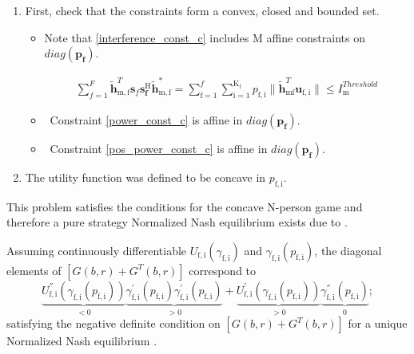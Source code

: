 \documentclass[12pt,a4paper]{report}
\begin{document}
\begin{enumerate}


\item
First, check that the constraints form a convex, closed and bounded set. 

\begin{itemize}

\item
	Note that \eqref{interference_const_c} includes $\text{M}$ affine constraints on $diag(\mathbf{p_{f}})$.

\begin{gather*}
	  \sum^F_{f=1} \mathbf{\tilde{h}}_{\mathrm{m,f}}^T  \mathbf{s}_{f} 						
	\mathbf{s_{f}^{\mathrm{H}}} \mathbf{\tilde{h}_{\mathrm{m,f}}^*} 
	=
	\sum_{\mathrm{f=1}}^{f}	\sum_{\mathrm{i=1}}^{\mathrm{K_f}}
	p_{\mathrm{f,i}}\|\tilde{\mathbf{h}}_{\mathrm{mf}}^T \mathbf{u}_{\mathrm{f,i}}\|
	\leq I^{Threshold}_{\mathrm{m}} 
\end{gather*}

\item \
	Constraint \eqref{power_const_c} is  affine in $diag(\mathbf{p_{f}})$.
	
\item \
	Constraint \eqref{pos_power_const_c} is affine in $diag(\mathbf{p_{f}})$.
\end{itemize}


\item The utility function was defined to be concave in $p_{\mathrm{f,i}}$. 

\end{enumerate}

This problem satisfies the conditions for the concave N-person game and therefore a pure strategy Normalized Nash equilibrium exists due to 
\cite[Thm1]{rosen1964existence}.

Assuming continuously differentiable $U_{\mathrm{f,i}}(\gamma_{\mathrm{f,i}})$ and $\gamma_{\mathrm{f,i}}(p_{\mathrm{f,i}})$, the diagonal elements of $[G(b,r)+G^{T}(b,r)] $ correspond to
\begin{equation}
\underbrace{U^{''}_{\mathrm{f,i}}(\gamma_{\mathrm{f,i}}(p_{\mathrm{f,i}}))}_{<0}\underbrace{\gamma^{'}_{\mathrm{f,i}}(p_{\mathrm{f,i}})\gamma^{'}_{\mathrm{f,i}}(p_{\mathrm{f,i}})}_{>0}
+
\underbrace{U^{'}_{\mathrm{f,i}}(\gamma_{\mathrm{f,i}}(p_{\mathrm{f,i}}))}_{>0}\underbrace{\gamma^{''}_{\mathrm{f,i}}(p_{\mathrm{f,i}})}_{0};
\end{equation}
satisfying the  negative definite condition on $[G(b,r)+G^{T}(b,r)] $ for a unique Normalized Nash equilibrium \cite[Thm4]{rosen1964existence}.
\end{document}
